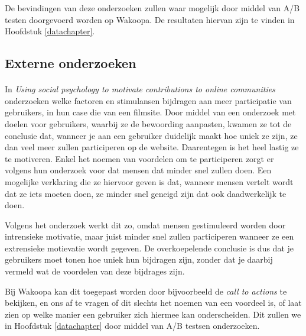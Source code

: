\documentclass[a4paper, 10pt, pdftex]{article}
\begin{document}
      De bevindingen van deze onderzoeken zullen waar mogelijk door middel van A/B testen doorgevoerd worden op Wakoopa. De resultaten hiervan zijn te vinden in Hoofdstuk \ref{datachapter}.

    \subsection{Externe onderzoeken}
      \paragraph{\cite{Beenen2004}}

      In \emph{Using social psychology to motivate contributions to online communities} onderzoeken \citeauthor{Beenen2004} welke factoren en stimulansen bijdragen aan meer participatie van gebruikers, in hun case die van een filmsite. Door middel van een onderzoek met doelen voor gebruikers, waarbij ze de bewoording aanpasten, kwamen ze tot de conclusie dat, wanneer je aan een gebruiker duidelijk maakt hoe uniek ze zijn, ze dan veel meer zullen participeren op de website. Daarentegen is het heel lastig ze te motiveren. Enkel het noemen van voordelen om te participeren zorgt er volgens hun onderzoek voor dat mensen dat minder snel zullen doen. Een mogelijke verklaring die ze hiervoor geven is dat, wanneer mensen vertelt wordt dat ze iets moeten doen, ze minder snel geneigd zijn dat ook daadwerkelijk te doen.

      Volgens het onderzoek werkt dit zo, omdat mensen gestimuleerd worden door intrensieke motivatie, maar juist minder snel zullen participeren wanneer ze een extrensieke motievatie wordt gegeven. De overkoepelende conclusie is dus dat je gebruikers moet tonen hoe uniek hun bijdragen zijn, zonder dat je daarbij vermeld wat de voordelen van deze bijdrages zijn.

      Bij Wakoopa kan dit toegepast worden door bijvoorbeeld de \emph{call to actions} te bekijken, en ons af te vragen of dit slechts het noemen van een voordeel is, of laat zien op welke manier een gebruiker zich hiermee kan onderscheiden. Dit zullen we in Hoofdstuk \ref{datachapter} door middel van A/B testsen onderzoeken.

     \paragraph{\cite{Sohn2005}}
\end{document}
